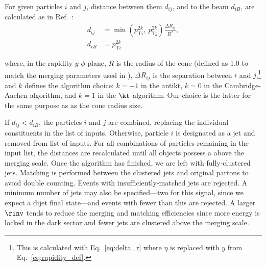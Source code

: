 For given particles $i$ and $j$, distance between them $d_{ij}$, and to the beam $d_{iB}$, are calculated as in Ref.~:
\begin{equation}
    \begin{aligned}
d_{ij} &= \min(p_{\mathrm{T}i}^{2k}, \ p_{\mathrm{T}j}^{2k}) \frac{\Delta R_{ij}}{R^2},\\
d_{iB} &= p_{\mathrm{T}i}^{2k}
    \end{aligned}
    \label{eq:distances_kt_pythia}
\end{equation}

where, in the rapidity $y$-$\phi$ plane, $R$ is the radius of the cone (defined as 1.0 to match the merging parameters used in \MADGRAPH), $\Delta R_{ij}$ is the separation between $i$ and $j$,\footnote{This is calculated with Eq.~\ref{eq:delta_r} where $\eta$ is replaced with $y$ from Eq.~\ref{eq:rapidity_def}.} and $k$ defines the algorithm choice: $k = -\text{1}$ in the \gls{antikt}, $k = \text{0}$ in the Cambridge-Aachen algorithm, and $k = \text{1}$ in the $\kt$ algorithm. Our choice is the latter for the same purpose as as the cone radius size.

If $d_{ij} < d_{iB}$, the particles $i$ and $j$ are combined, replacing the individual constituents in the list of inputs. Otherwise, particle $i$ is designated as a jet and removed from list of inputs. For all combinations of particles remaining in the input list, the distances are recalculated until all objects possess a \pt above the merging scale. Once the algorithm has finished, we are left with fully-clustered \glspl{jet}. Matching is performed between the clustered jets and original partons to avoid double counting. Events with insufficiently-matched jets are rejected. A minimum number of \glspl{jet} may also be specified---two for this signal, since we expect a dijet final state---and events with fewer than this are rejected. A larger $\rinv$ tends to reduce the merging and matching efficiencies since more energy is locked in the dark sector and fewer jets are clustered above the merging scale.




